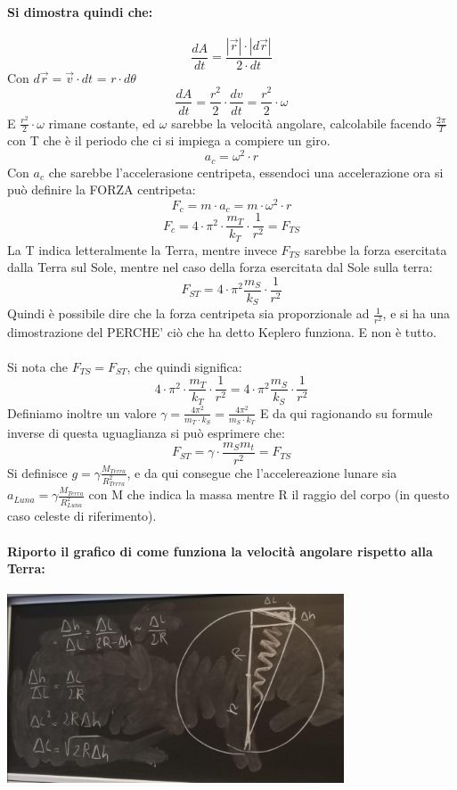 \documentclass[12pt, a4paper, openany, oneside]{book}
\begin{document}
\paragraph{Si dimostra quindi che: }
\[
\frac{dA}{dt} = \frac{|\overrightarrow{r}|\cdot |d \overrightarrow{r}|}{2\cdot dt}
\]	
Con  $d \overrightarrow{r} = \overrightarrow{v}\cdot dt$ = $r\cdot d \theta$
\[
\frac{dA}{dt} = \frac{r^{2}}{2} \cdot \frac{dv}{dt} = \frac{r^{2}}{2}\cdot \omega
\]
E $\frac{r^{2}}{2}\cdot \omega$ rimane costante, ed $\omega$ sarebbe la velocità
angolare, calcolabile facendo $\frac{2\pi}{T}$ con T che è il periodo che ci
si impiega a compiere un giro.
\[
a_{c} = \omega^{2} \cdot r
\]	
Con $a_{c}$ che sarebbe l'accelerasione centripeta, essendoci una accelerazione
ora si può definire la FORZA centripeta:
\[
F_{c} = m\cdot a_{c} = m\cdot \omega^{2}\cdot r
\]	
\[
F_{c} = 4 \cdot \pi^{2} \cdot \frac{m_{T}}{k_{T}} \cdot \frac{1}{r^{2}} = F_{TS}
\]	
La T indica letteralmente la Terra, mentre invece
$F_{TS}$ sarebbe la forza esercitata dalla Terra sul Sole, mentre nel caso della 
forza esercitata dal Sole sulla terra:
\[
F_{ST} = 4\cdot \pi^{2} \frac{m_{S}}{k_{S}} \cdot \frac{1}{r^{2}}
\]	
Quindi è possibile dire che la forza centripeta sia proporzionale ad 
$\frac{1}{r^2}$, e si ha una dimostrazione del PERCHE' ciò che ha detto Keplero
funziona. E non è tutto. \\ \\ 
Si nota che $F_{TS} = F_{ST}$, che quindi significa: 
\[
4 \cdot \pi^{2} \cdot \frac{m_{T}}{k_{T}} \cdot \frac{1}{r^{2}} = 
4\cdot \pi^{2} \frac{m_{S}}{k_{S}} \cdot \frac{1}{r^{2}}
\]
Definiamo inoltre un valore $\gamma = \frac{4\pi^2}{m_{T}\cdot k_{S}} = 
\frac{4\pi^2}{m_{S}\cdot k_{T}}$ E da qui ragionando su formule inverse di 
questa uguaglianza si può esprimere che:
\[
F_{ST} = \gamma\cdot \frac{m_{S}m_{t}}{r^{2}} = F_{TS}
\]	
Si definisce $g = \gamma \frac{M_{Terra}}{R_{Terra}^{2}}$, e da qui consegue che
l'accelereazione lunare sia $a_{Luna} = \gamma \frac{M_{Terra}}{R_{Luna}^{2}}$
con M che indica la massa mentre R il raggio del corpo (in questo caso celeste
di riferimento).
\paragraph{Riporto il grafico di come funziona la velocità angolare rispetto
alla Terra: }
\begin{center}
\includegraphics[width=0.75\textwidth]{3}
\end{center}
\end{document}
